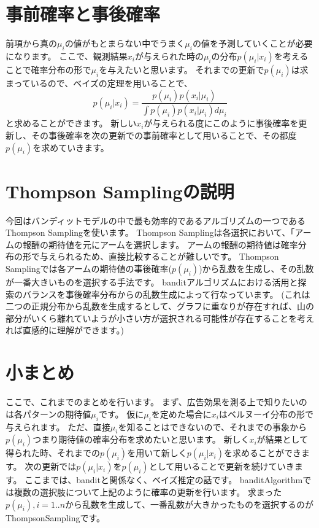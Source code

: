 \documentclass[a4j,twocolumn]{jarticle}
\begin{document}
\vspace{-6mm}
\section{事前確率と事後確率}
前項から真の$\mu_i$の値がもとまらない中でうまく$\mu_i$の値を予測していくことが必要になります。
ここで、観測結果$x_i$が与えられた時の$\mu_i$の分布$p(\mu_i|x_i)$を考えることで確率分布の形で$\mu_i$を与えたいと思います。
それまでの更新で$p(\mu_i)$は求まっているので、ベイズの定理を用いることで、
\begin{displaymath}
p(\mu_i|x_i) = \frac{p(\mu_i)p(x_i|\mu_i)}{\int p(\mu_i)p(x_i|\mu_i)d\mu_i}
\end{displaymath}
と求めることができます。
新しい$x_i$が与えられる度にこのように事後確率を更新し、その事後確率を次の更新での事前確率として用いることで、その都度$p(\mu_i)$を求めていきます。

\vspace{-6mm}
\section{Thompson Samplingの説明}
今回はバンディットモデルの中で最も効率的であるアルゴリズムの一つであるThompson Samplingを使います。
Thompson Samplingは各選択において、「アームの報酬の期待値を元にアームを選択します。
アームの報酬の期待値は確率分布の形で与えられるため、直接比較することが難しいです。
Thompson Samplingでは各アームの期待値の事後確率($p(\mu_i)$)から乱数を生成し、その乱数が一番大きいものを選択する手法です。
banditアルゴリズムにおける活用と探索のバランスを事後確率分布からの乱数生成によって行なっています。
(これは二つの正規分布から乱数を生成するとして、グラフに重なりが存在すれば、山の部分がいくら離れていようが小さい方が選択される可能性が存在することを考えれば直感的に理解ができます。)
\vspace{-6mm}
\section{小まとめ}
ここで、これまでのまとめを行います。
まず、広告効果を測る上で知りたいのは各パターンの期待値$\mu_i$です。
仮に$\mu_i$を定めた場合に$x_i$はベルヌーイ分布の形で与えられます。
ただ、直接$\mu_i$を知ることはできないので、それまでの事象から$p(\mu_i)$つまり期待値の確率分布を求めたいと思います。
新しく$x_i$が結果として得られた時、それまでの$p(\mu_i)$を用いて新しく$p(\mu_i|x_i)$を求めることができます。
次の更新では$p(\mu_i|x_i)$を$p(\mu_i)$として用いることで更新を続けていきます。
ここまでは、banditと関係なく、ベイズ推定の話です。
banditAlgorithmでは複数の選択肢について上記のように確率の更新を行います。
求まった$p(\mu_i), i = 1..n$から乱数を生成して、一番乱数が大きかったものを選択するのがThompsonSamplingです。
\end{document}
